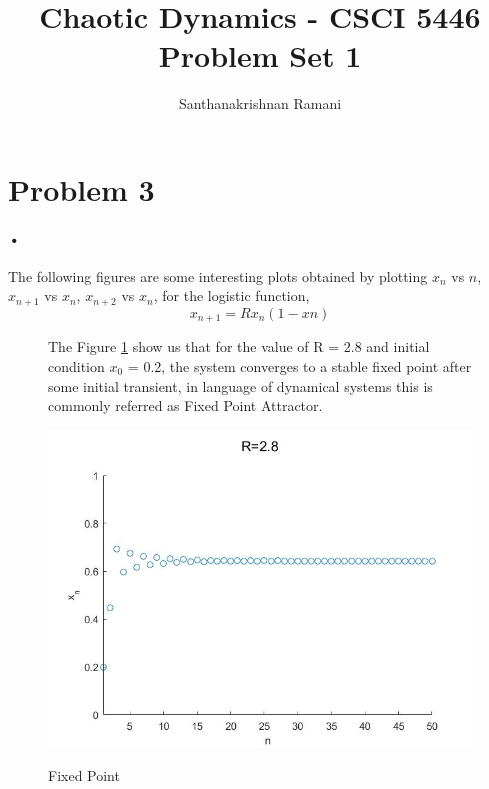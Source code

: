 \documentclass[11pt,a4paper]{article}
\title{\textbf{Chaotic Dynamics - CSCI 5446} \\
Problem Set 1}
\author{Santhanakrishnan Ramani}
\begin{document}
\maketitle
\section*{Problem 3}
\paragraph{•}
The following figures are some interesting plots obtained by plotting $x_{n}$ vs $n$, $x_{n+1}$ vs $x_{n}$, $x_{n+2}$ vs $x_{n}$, for the logistic function, $$x_{n+1} = Rx_{n}(1-x{n})$$
\begin{figure}[H]
{
The Figure \ref{fig:fp} show us that for the value of R = 2.8 and initial condition $x_{0}$ = 0.2, the system converges to a stable fixed point after some initial transient, in language of dynamical systems this is commonly referred as Fixed Point Attractor.\par
\bigskip
\centering 
\includegraphics[scale=0.5]{images/fixed.jpg}
\caption{Fixed Point}\par\medskip
\label{fig:fp}
}
\end{figure}
\end{document}
